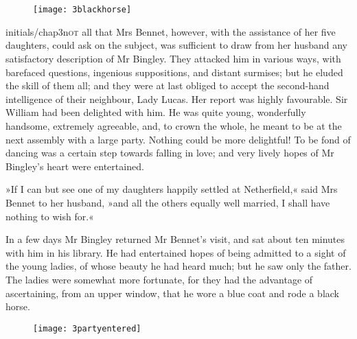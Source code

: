 
\chapter[Chapter \thechapter]{}
	

	\begin{figure}[t!]
		\centering
		\texttt{[image: 3blackhorse]}
	\end{figure}


\lettrine[lines=6,image=true]{initials/chap3n}{ot} all that Mrs Bennet, however, with the assistance of her five daughters, could ask on the subject, was sufficient to draw from her husband any satisfactory description of Mr Bingley. They attacked him in various ways, with barefaced questions, ingenious suppositions, and distant surmises; but he eluded the skill of them all; and they were at last obliged to accept the second-hand intelligence of their neighbour, Lady Lucas. Her report was highly favourable. Sir William had been delighted with him. He was quite young, wonderfully handsome, extremely agreeable, and, to crown the whole, he meant to be at the next assembly with a large party. Nothing could be more delightful! To be fond of dancing was a certain step towards falling in love; and very lively hopes of Mr Bingley's heart were entertained.

»If I can but see one of my daughters happily settled at Netherfield,« said Mrs Bennet to her husband, »and all the others equally well married, I shall have nothing to wish for.«

In a few days Mr Bingley returned Mr Bennet's visit, and sat about ten minutes with him in his library. He had entertained hopes of being admitted to a sight of the young ladies, of whose beauty he had heard much; but he saw only the father. The ladies were somewhat more fortunate, for they had the advantage of ascertaining, from an upper window, that he wore a blue coat and rode a black horse.

\begin{figure}[tbh]
\centering
\texttt{[image: 3partyentered]}
\end{figure}

